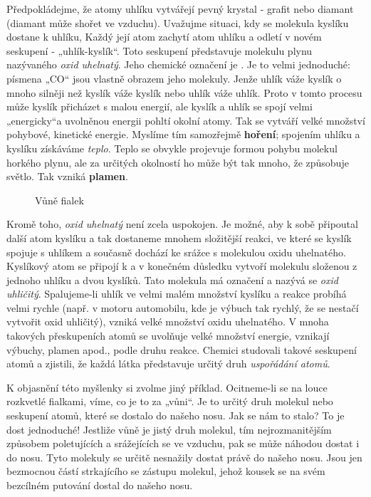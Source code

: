     Předpokládejme, že atomy uhlíku vytvářejí pevný krystal - grafit nebo diamant (diamant může
    shořet ve vzduchu). Uvažujme situaci, kdy se molekula kyslíku dostane k uhlíku, Každý její atom
    zachytí atom uhlíku a odletí v novém seskupení - „uhlík-kyslík“. Toto seskupení představuje
    molekulu plynu nazývaného \emph{oxid uhelnatý}. Jeho chemické označení je . Je to velmi
    jednoduché: písmena „CO“ jsou vlastně obrazem jeho molekuly. Jenže uhlík váže kyslík o mnoho
    silněji než kyslík váže kyslík nebo uhlík váže uhlík. Proto v tomto procesu může kyslík
    přicházet s malou energií, ale kyslík a uhlík se spojí velmi „energicky“a uvolněnou energii
    pohltí okolní atomy. Tak se vytváří velké množství pohybové, kinetické energie. Myslíme tím
    samozřejmě \textbf{hoření}; spojením uhlíku a kyslíku získáváme \emph{teplo}. Teplo se obvykle
    projevuje formou pohybu molekul horkého plynu, ale za určitých okolností ho může být tak mnoho,
    že způsobuje světlo. Tak vzniká \textbf{plamen}.
    
    \begin{figure}[hbt!]    %
      \centering
      \caption{Vůně fialek \cite[s.~24]{Feynman01}}
      \label{fyz:fig0015}
    \end{figure}

    Kromě toho, \emph{oxid uhelnatý} není zcela uspokojen. Je možné, aby k sobě připoutal další atom
    kyslíku a tak dostaneme mnohem složitější reakci, ve které se kyslík spojuje s uhlíkem a
    současně dochází ke srážce s molekulou oxidu uhelnatého. Kyslíkový atom se připojí k  a v
    konečném důsledku vytvoří molekulu složenou z jednoho uhlíku a dvou kyslíků. Tato molekula má
    označení  a nazývá se \emph{oxid uhličitý}. Spalujeme-li uhlík ve velmi malém množství
    kyslíku a reakce probíhá velmi rychle (např. v motoru automobilu, kde je výbuch tak rychlý, že
    se nestačí vytvořit oxid uhličitý), vzniká velké množství oxidu uhelnatého. V mnoha takových
    přeskupeních atomů se uvolňuje velké množství energie, vznikají výbuchy, plamen apod., podle
    druhu reakce. Chemici studovali takové seskupení atomů a zjistili, že každá látka představuje
    určitý druh \emph{uspořádání atomů}.

    K objasnění této myšlenky si zvolme jiný příklad. Ocitneme-li se na louce rozkvetlé fialkami,
    víme, co je to za „vůni“. Je to určitý druh molekul nebo seskupení atomů, které se dostalo do
    našeho nosu. Jak se nám to stalo? To je dost jednoduché! Jestliže vůně je jistý druh molekul,
    tím nejrozmanitějším způsobem poletujících a srážejících se ve vzduchu, pak se může náhodou
    dostat i do nosu. Tyto molekuly se určitě nesnažily dostat právě do našeho nosu. Jsou jen
    bezmocnou částí strkajícího se zástupu molekul, jehož kousek se na svém bezcílném putování
    dostal do našeho nosu.      
    
